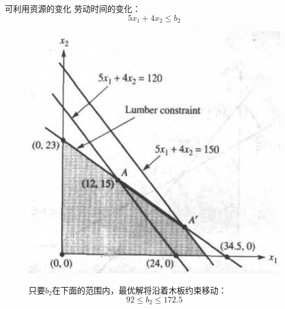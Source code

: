 \documentclass[mathserif, table]{beamer}
\begin{document}
\begin{frame}{可利用资源的变化}
  劳动时间的变化：
  \[
  5x_1 + 4x_2 \le b_2
  \]

  \begin{figure}
    \begin{minipage}{.5\linewidth}
      \includegraphics[width=\textwidth{}]{labor.png}
    \end{minipage}%
    \begin{minipage}{.5\linewidth}
      只要$b_2$在下面的范围内，最优解将沿着木板约束移动：
      \[
      92 \le b_2 \le 172.5
      \]
    \end{minipage}
  \end{figure}  

\end{frame}
\end{document}
